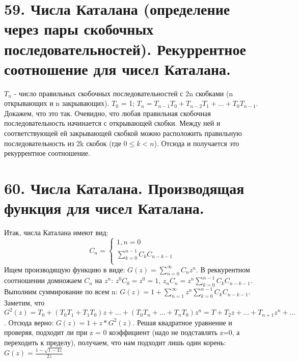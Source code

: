 \section*{59. Числа Каталана (определение через пары скобочных последовательностей). Рекуррентное соотношение для чисел Каталана.}

$T_n$ - число правильных скобочных последовательностей с 2n скобками (n открывающих и n закрывающих).
$T_0$ = 1; $T_n = T_{n-1}T_0 + T_{n-2}T_1 + \dots + T_0T_{n-1}$.
Докажем, что это так. Очевидно, что любая правильная скобочная последовательность начинается с открывающей скобки. Между ней и соответствующей ей закрывающей скобкой можно расположить правильную последовательность из 2k скобок (где $0\leqslant k<n$). Отсюда и получается это рекуррентное соотношение.

\section*{60. Числа Каталана. Производящая функция для чисел Каталана.}
Итак, числа Каталана имеют вид:
\[ C_n = \left\{
  \begin{array}{ccc}
    1, n = 0 \\
    \sum_{k=0}^{n-1} C_k C_{n-k-1}\\
  \end{array}
\right. \]
Ищем производящую функцию в виде: $G(z) = \sum_{n=0}^{\infty}C_n z^n$. В реккурентном соотношении домножаем $C_n$ на $z^n$: $z^0 C_0 = z^0 = 1$, $z_n C_n = z^n \sum_{k=0}^{n-1} C_k C_{n-k-1}$. Выполним суммирование по всем n: $G(z) = 1 + \sum_{n=1}^{\infty}z^n \sum_{k=0}^{n-1} C_k C_{n-k-1}$. Заметим, что $G^2(z) = T_0 + (T_0T_1 + T_1T_0)z + \dots + (T_0T_n + \dots + T_nT_0)z^n = T + T_2z + \dots + T_{n+1}z^n + \dots$. Отсюда верно: $G(z) = 1 + z*G^2(z)$. Решая квадратное уравнение и проверяя, подходит ли при z = 0 коэффициент (надо не подставлять z=0, а переходить к пределу), получаем, что нам подходит лишь один корень: $G(z) = \frac{1 - \sqrt{1-4z}}{2z}$

